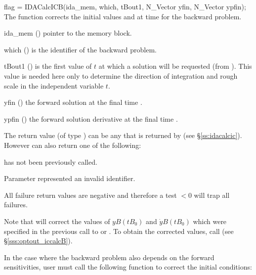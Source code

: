 {
  flag = IDACalcICB(ida\_mem, which, tBout1, N\_Vector yfin, N\_Vector ypfin);
}
{
  The function  corrects the initial values  and  at
  time  for the backward problem.
}
{
  \begin{args}
  \item[ida\_mem] ()
    pointer to the {\idas} memory block.
  \item[which] ()
    is the identifier of the backward problem.
  \item[tBout1] ()
    is the first value of $t$ at which a solution will be requested (from
    ). This value is needed here only to determine the direction of
    integration and rough scale in the independent variable $t$.
  \item[yfin] ()
    the forward solution at the final time .
  \item[ypfin] ()
    the forward solution derivative at the final time .
  \end{args}
}
{
  The return value  (of type ) can be any that is returned by
   (see \S\ref{ss:idacalcic}). However  can also
  return one of the following:

  \begin{args}
  \item[\Id{IDA\_NO\_ADJ}]
     has not been previously called.
  \item[\id{IDA\_ILL\_INPUT}]
    Parameter  represented an invalid identifier.
  \end{args}
}
{
  All failure return values are negative and therefore a test  $< 0$
  will trap all  failures.

  Note that  will correct the values of $yB(tB_0)$ and
  $\dot{y}B(tB_0)$ which were specified in the previous call to 
  or . To obtain the corrected values, call
   (see \S\ref{sss:optout_iccalcB}).
}

In the case where the backward problem also depends on the forward sensitivities,
user must call the following function to correct the initial conditions:

